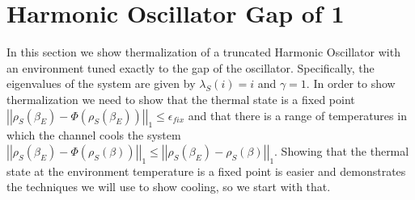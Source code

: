 \documentclass{article}
\newcommand{\norm}[1]{\left| \left| #1 \right| \right|}
\begin{document}
 
\section{Harmonic Oscillator Gap of 1}

In this section we show thermalization of a truncated Harmonic Oscillator with an environment tuned exactly to the gap of the oscillator. Specifically, the eigenvalues of the system are given by $\lambda_S(i) = i$ and $\gamma = 1$. In order to show thermalization we need to show that the thermal state is a fixed point $\norm{\rho_S(\beta_E) - \Phi(\rho_S(\beta_E))}_1 \leq \epsilon_{fix}$ and that there is a range of temperatures in which the channel cools the system $\norm{\rho_S(\beta_E) - \Phi(\rho_S(\beta))}_1 \leq \norm{\rho_S(\beta_E) - \rho_S(\beta)}_1$. Showing that the thermal state at the environment temperature is a fixed point is easier and demonstrates the techniques we will use to show cooling, so we start with that.
\end{document}
